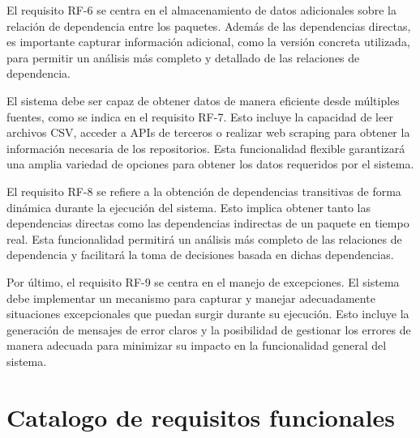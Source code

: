 El requisito RF-6 se centra en el almacenamiento de datos adicionales sobre la relación de dependencia 
entre los paquetes. Además de las dependencias directas, es importante capturar información adicional, 
como la versión concreta utilizada, para permitir un análisis más completo y detallado de las relaciones
 de dependencia.

El sistema debe ser capaz de obtener datos de manera eficiente desde múltiples fuentes, como se indica 
en el requisito RF-7. Esto incluye la capacidad de leer archivos CSV, acceder a APIs de terceros o 
realizar web scraping para obtener la información necesaria de los repositorios. Esta funcionalidad 
flexible garantizará una amplia variedad de opciones para obtener los datos requeridos por el sistema.

El requisito RF-8 se refiere a la obtención de dependencias transitivas de forma dinámica durante la 
ejecución del sistema. Esto implica obtener tanto las dependencias directas como las dependencias 
indirectas de un paquete en tiempo real. Esta funcionalidad permitirá un análisis más completo de las 
relaciones de dependencia y facilitará la toma de decisiones basada en dichas dependencias.

Por último, el requisito RF-9 se centra en el manejo de excepciones. El sistema debe implementar un 
mecanismo para capturar y manejar adecuadamente situaciones excepcionales que puedan surgir durante su 
ejecución. Esto incluye la generación de mensajes de error claros y la posibilidad de gestionar los 
errores de manera adecuada para minimizar su impacto en la funcionalidad general del sistema.

\section{Catalogo de requisitos funcionales}

